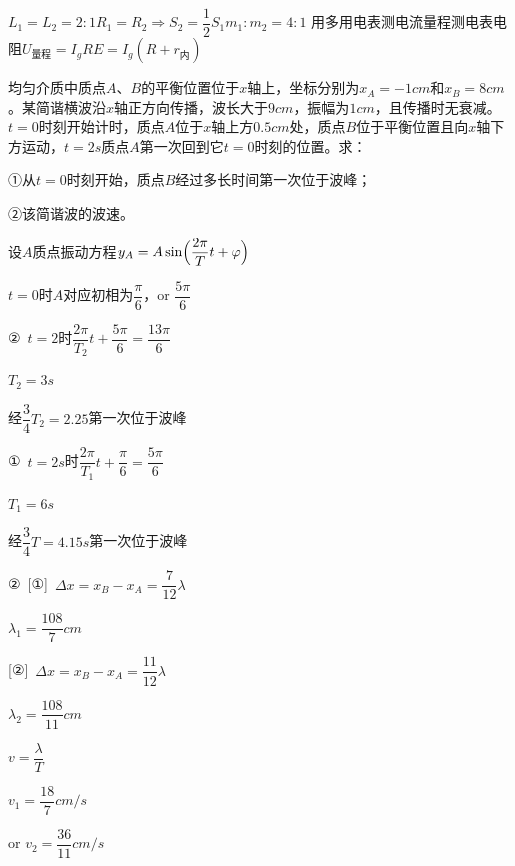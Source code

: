 $L_1=L_2=2:1$\quad $R_1=R_2\Rightarrow S_2=\dfrac{1}{2}S_1$\quad $m_1:m_2=4:1$%
用多用电表测电流量程\quad 测电表电阻\quad $U_{\text{量程}}=I_gR$\quad $E=I_g(R+r_{\text{内}})$%
\begin{problem}[10分]
均匀介质中质点$A$、$B$的平衡位置位于$x$轴上，坐标分别为$x_A=-1\unit{cm}$和$x_B=8\unit{cm}$。某简谐横波沿$x$轴正方向传播，波长大于$9\unit{cm}$，振幅为$1\unit{cm}$，且传播时无衰减。$t=0$时刻开始计时，质点$A$位于$x$轴上方$0.5\unit{cm}$处，质点$B$位于平衡位置且向$x$轴下方运动，$t=2\unit{s}$质点$A$第一次回到它$t=0$时刻的位置。求：

①从$t=0$时刻开始，质点$B$经过多长时间第一次位于波峰；

②该简谐波的波速。
\begin{solution}
设$A$质点振动方程\quad $y_A=A\sin\Bigl(\dfrac{2\pi}{T}t+\varphi\Bigr)$

$t=0$时$A$对应初相为$\dfrac{\pi}{6}$，or $\dfrac{5\pi}{6}$

②\ $t=2$时\quad $\dfrac{2\pi}{T_2}t+\dfrac{5\pi}{6}=\dfrac{13\pi}{6}$

$T_2=3\unit{s}$

经$\dfrac{3}{4}T_2=2.25$第一次位于波峰

①\ $t=2\unit{s}$时\quad $\dfrac{2\pi}{T_1}t+\dfrac{\pi}{6}=\dfrac{5\pi}{6}$

$T_1=6\unit{s}$

经$\dfrac{3}{4}T=4.15\unit{s}$第一次位于波峰%

②\ [①]\ $\Delta x=x_B-x_A=\dfrac{7}{12}\lambda$

$\lambda_1=\dfrac{108}{7}\unit{cm}$

[②]\ $\Delta x=x_B-x_A=\dfrac{11}{12}\lambda$

$\lambda_2=\dfrac{108}{11}\unit{cm}$

$v=\dfrac{\lambda}{T}$

$v_1=\dfrac{18}{7}\unit{cm/s}$

or $v_2=\dfrac{36}{11}\unit{cm/s}$
\end{solution}
\end{problem}
